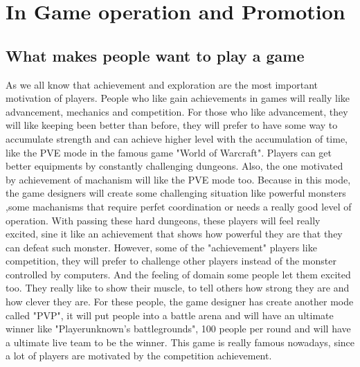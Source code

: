 \documentclass[12pt]{article}
\begin{document}
    \section{In Game operation and Promotion}
        \subsection{What makes people want to play a game}
            As we all know that achievement and exploration are the most important motivation of
            players. People who like gain achievements in games will really like advancement,
            mechanics and competition. For those who like advancement, they will like keeping been
            better than before, they will prefer to have some way to accumulate strength and can achieve
            higher level with the accumulation of time, like the PVE mode in the famous game "World of Warcraft".
            Players can get better equipments by constantly challenging dungeons. Also, the one
            motivated by achievement of machanism will like the PVE mode too. Because in this mode,
            the game designers will create some challenging situation like powerful monsters ,some
            machanisms that require perfet coordination or needs a really good level of operation.
            With passing these hard dungeons, these players will feel really excited, sine it like
            an achievement that shows how powerful they are that they can defeat such monster.
            However, some of the "achievement" players like competition, they will prefer to challenge
            other players instead of the monster controlled by computers.
            And the feeling of domain some people let them excited too. They really like to show their
            muscle, to tell others how strong they are and how clever they are. For these people, the
            game designer has create another mode called "PVP", it will put people into a battle arena
            and will have an ultimate winner like "Playerunknown's battlegrounds", 100 people per round and will have a ultimate
            live team to be the winner. This game is really famous nowadays, since a lot of players
            are motivated by the competition achievement.\\
\end{document}
